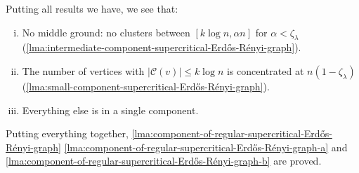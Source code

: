Putting all results we have, we see that:
\begin{enumerate}[(i)]
	\item No middle ground: no clusters between \([k \log n, \alpha n]\) for \(\alpha < \zeta _\lambda \) (\autoref{lma:intermediate-component-supercritical-Erdős-Rényi-graph}).
	\item The number of vertices with \(\lvert \mathcal{C} (v) \rvert \leq k \log n\) is concentrated at \(n (1 - \zeta _\lambda )\) (\autoref{lma:small-component-supercritical-Erdős-Rényi-graph}).
	\item Everything else is in a single component.
\end{enumerate}

Putting everything together, \autoref{lma:component-of-regular-supercritical-Erdős-Rényi-graph} \autoref{lma:component-of-regular-supercritical-Erdős-Rényi-graph-a} and \autoref{lma:component-of-regular-supercritical-Erdős-Rényi-graph-b} are proved.